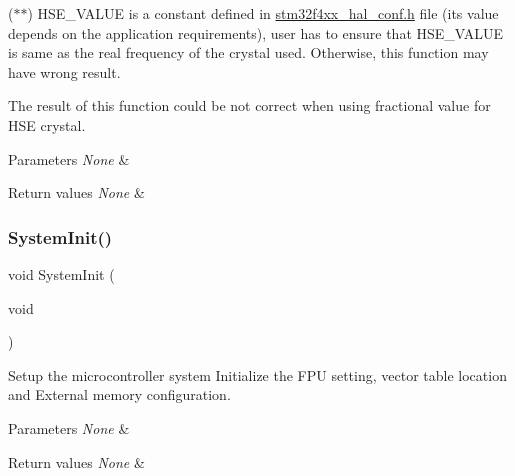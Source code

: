 ($\ast$$\ast$) H\+S\+E\+\_\+\+V\+A\+L\+UE is a constant defined in \mbox{\hyperlink{stm32f4xx__hal__conf_8h_source}{stm32f4xx\+\_\+hal\+\_\+conf.\+h}} file (its value depends on the application requirements), user has to ensure that H\+S\+E\+\_\+\+V\+A\+L\+UE is same as the real frequency of the crystal used. Otherwise, this function may have wrong result.


\begin{DoxyItemize}
\item The result of this function could be not correct when using fractional value for H\+SE crystal.
\end{DoxyItemize}


\begin{DoxyParams}{Parameters}
{\em None} & \\
\hline
\end{DoxyParams}

\begin{DoxyRetVals}{Return values}
{\em None} & \\
\hline
\end{DoxyRetVals}
\mbox{\label{group___s_t_m32_f4xx___system___private___functions_ga93f514700ccf00d08dbdcff7f1224eb2}} 
\subsubsection{\texorpdfstring{SystemInit()}{SystemInit()}}
{\footnotesize\ttfamily void System\+Init (\begin{DoxyParamCaption}\item[{void}]{ }\end{DoxyParamCaption})}



Setup the microcontroller system Initialize the F\+PU setting, vector table location and External memory configuration. 


\begin{DoxyParams}{Parameters}
{\em None} & \\
\hline
\end{DoxyParams}

\begin{DoxyRetVals}{Return values}
{\em None} & \\
\hline
\end{DoxyRetVals}
